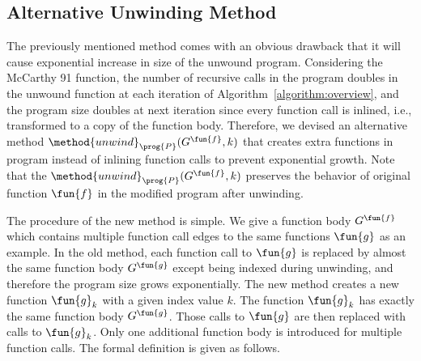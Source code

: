 \subsection{Alternative Unwinding Method}\label{subsec:new-unwinding}
The previously mentioned method comes with an obvious drawback that it will
cause exponential increase in size of the unwound program.
Considering the McCarthy 91 function, the number of recursive calls in the
program doubles in the unwound function at each iteration of
Algorithm~\ref{algorithm:overview},
and the program size doubles at next iteration since every function call is
inlined, i.e., transformed to a copy of the function body.
Therefore, we devised an alternative method $\method{unwind}_\prog{P}(G^\fun{f}, k)$
that creates extra functions in program  instead of inlining function
calls to prevent exponential growth.
Note that the $\method{unwind}_\prog{P}(G^\fun{f}, k)$ preserves the behavior of
original function $\fun{f}$ in the modified program  after unwinding.

The procedure of the new method is simple.
We give a function body $G^\fun{f}$ which contains multiple function call edges
to the same functions $\fun{g}$ as an example.
In the old method, each function call to $\fun{g}$ is replaced by almost the
same function body $G^\fun{g}$ except being indexed during unwinding,
and therefore the program size grows exponentially.
The new method creates a new function $\fun{g}_k$ with a given index value $k$.
The function $\fun{g}_k$ has exactly the same function body $G^\fun{g}$.
Those calls to $\fun{g}$ are then replaced with calls to $\fun{g}_k$.
Only one additional function body is introduced for multiple function
calls.
The formal definition is given as follows.

